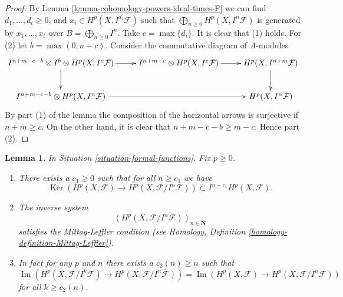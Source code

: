 \documentclass{stacks-project}
\theoremstyle{plain}
\newtheorem{lemma}[subsection]{Lemma}
\theoremstyle{definition}
\theoremstyle{remark}
\numberwithin{equation}{subsection}
\def\Ker{\mathop{\mathrm{Ker}}}
\def\Im{\mathop{\mathrm{Im}}}
\begin{document}
\begin{proof}
By Lemma \ref{lemma-cohomology-powers-ideal-times-F}
we can find $d_1, \ldots, d_t \geq 0$, and
$x_i \in H^p(X, I^{d_i}\mathcal{F})$ such that
$\bigoplus_{n \geq 0} H^p(X, I^n\mathcal{F})$ is generated
by $x_1, \ldots, x_t$ over $B = \bigoplus_{n \geq 0} I^n$.
Take $c = \max\{d_i\}$. It is clear that (1) holds.
For (2) let $b = \max(0, n - c)$.
Consider the commutative diagram of $A$-modules
$$
\xymatrix{
I^{n + m - c - b} \otimes I^b \otimes
H^p(X, I^c\mathcal{F}) \ar[r] \ar[d] &
I^{n + m - c} \otimes H^p(X, I^c\mathcal{F}) \ar[r] &
H^p(X, I^{n + m}\mathcal{F}) \ar[d] \\
I^{n + m - c - b} \otimes H^p(X, I^n\mathcal{F}) \ar[rr] & &
H^p(X, I^n\mathcal{F})
}
$$
By part (1) of the lemma the composition of the horizontal arrows
is surjective if $n + m \geq c$. On the other hand, it is clear
that $n + m - c - b \geq m - c$. Hence part (2).
\end{proof}

\begin{lemma}
\label{lemma-ML-cohomology-powers-ideal}
In Situation \ref{situation-formal-functions}.
Fix $p \geq 0$.
\begin{enumerate}
\item There exists a $c_1 \geq 0$ such that for all $n \geq c_1$
we have
$$
\Ker(
H^p(X, \mathcal{F}) \to H^p(X, \mathcal{F}/I^n\mathcal{F})
)
\subset
I^{n - c_1}H^p(X, \mathcal{F}).
$$
\item The inverse system
$$
\left(H^p(X, \mathcal{F}/I^n\mathcal{F})\right)_{n \in \mathbf{N}}
$$
satisfies the Mittag-Leffler condition (see
Homology, Definition \ref{homology-definition-Mittag-Leffler}).
\item In fact for any $p$ and $n$ there exists a $c_2(n) \geq n$
such that
$$
\Im(H^p(X, \mathcal{F}/I^k\mathcal{F})
\to H^p(X, \mathcal{F}/I^n\mathcal{F}))
=
\Im(H^p(X, \mathcal{F})
\to H^p(X, \mathcal{F}/I^n\mathcal{F}))
$$
for all $k \geq c_2(n)$.
\end{enumerate}
\end{lemma}
\end{document}
